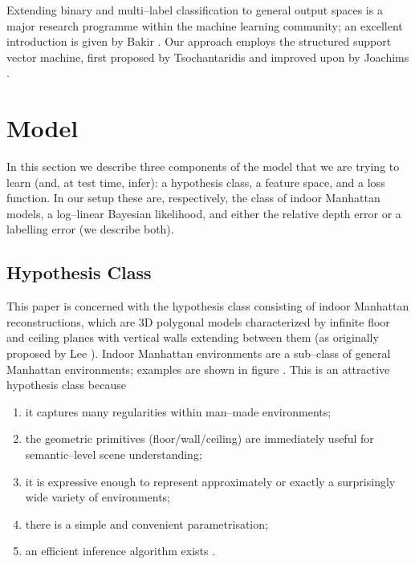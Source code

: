 Extending binary and multi--label classification to general output
spaces is a major research programme within the machine learning
community; an excellent introduction is given by Bakir \etal
\cite{Bakir07}. Our approach employs the structured support vector
machine, first proposed by Tsochantaridis \etal
\cite{Tsochantaridis04} and improved upon by Joachims \etal
\cite{Joachims2009}.

\section{Model}
\label{sec:model}

In this section we describe three components of the model that we are
trying to learn (and, at test time, infer): a hypothesis class, a
feature space, and a loss function. In our setup these are,
respectively, the class of indoor Manhattan models, a log--linear
Bayesian likelihood, and either the relative depth error or a
labelling error (we describe both).

\subsection{Hypothesis Class}

This paper is concerned with the hypothesis class consisting of indoor
Manhattan reconstructions, which are 3D polygonal models characterized
by infinite floor and ceiling planes with vertical walls extending
between them (as originally proposed by Lee \etal
\cite{Lee09}). Indoor Manhattan environments are a sub--class of
general Manhattan environments; examples are shown in figure
. This is an attractive hypothesis class
because
\begin{enumerate}
\item{it captures many regularities within man--made environments;}
\item{the geometric primitives (floor/wall/ceiling) are immediately
  useful for semantic--level scene understanding;}
\item{it is expressive enough to represent approximately or exactly
  a surprisingly wide variety of environments;}
\item{there is a simple and convenient parametrisation;}
\item{an efficient inference algorithm exists \cite{Flint10eccv}.}
\end{enumerate}

